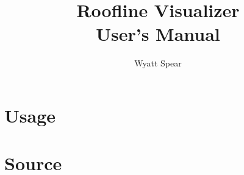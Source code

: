 \documentclass[12pt,titlepage]{article}
\title{Roofline Visualizer \\
       User's Manual
      }
\author{
        Wyatt Spear
       }
\begin{document}
\maketitle

\newpage


\section{Usage}
\label{section:usage}


\section{Source}
\label{section:source}

\end{document}
